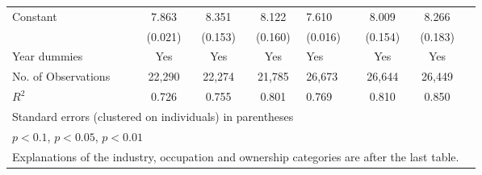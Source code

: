 \begin{longtable}{l*{3}{c}|l*{3}{c}}
	Constant            &       7.863\sym{***}&       8.351\sym{***}&       8.122\sym{***}&       7.610\sym{***}&       8.009\sym{***}&       8.266\sym{***}\\
	&     (0.021)         &     (0.153)         &     (0.160)         &     (0.016)         &     (0.154)         &     (0.183)         \\
		Year dummies        &         Yes         &         Yes         &         Yes         &         Yes         &         Yes         &         Yes         \\
		\midrule
	No. of	Observations        &       22,290         &       22,274         &       21,785         &       26,673         &       26,644         &       26,449         \\
		 \(R^{2}\)  &       0.726         &       0.755         &       0.801         &       0.769         &       0.810         &       0.850         \\
		\bottomrule
		\multicolumn{7}{l}{\footnotesize Standard errors (clustered on individuals) in parentheses}\\
		\multicolumn{7}{l}{\footnotesize \sym{*} \(p<0.1\), \sym{**} \(p<0.05\), \sym{***} \(p<0.01\)} \\
		\multicolumn{7}{l}{Explanations of the industry, occupation and ownership categories are after the last table.}
          \label{tab:et_wage_full}
	\end{longtable}


\clearpage

